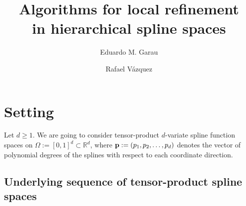 \documentclass[12pt,a4paper,pdftex]{article}
\theoremstyle{plain}
\theoremstyle{definition}
\theoremstyle{remark}
\newcommand{\snote}[1]{\fbox{\textbf{#1}}}
\newcommand{\RR}{\mathbb R}
\begin{document}
\title{Algorithms for local refinement \\ in hierarchical spline spaces}


\author[1,2,3]{Eduardo M. Garau}%
\author[1]{Rafael V\'azquez}

\maketitle
% 
%  
% 
% 


\section{Setting}

Let $d\ge 1$. We are going to consider tensor-product $d$-variate spline function spaces on $\Omega:=[0,1]^d\subset \RR^d$, where ${\bf p}:=(p_1,p_2,\dots,p_d)$ denotes the vector of polynomial degrees of the splines with respect to each coordinate direction.

\subsection{Underlying sequence of tensor-product spline spaces}
\end{document}
